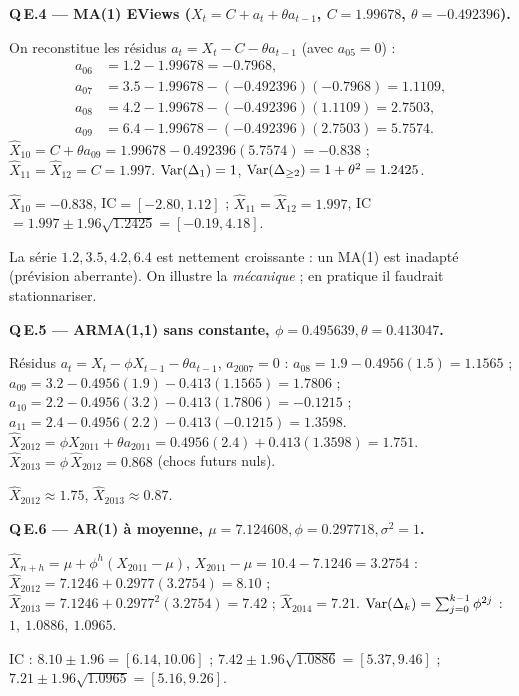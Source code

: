 \documentclass[11pt]{article}
\begin{document}
\textbf{Q\,E.4 --- MA(1) EViews ($X_t=C+a_t+\theta a_{t-1}$, $C=1.99678$, $\theta=-0.492396$).}
\begin{etapes}
On reconstitue les résidus $a_t=X_t-C-\theta a_{t-1}$ (avec $a_{05}=0$) :
\begin{align*}
a_{06}&=1.2-1.99678=-0.7968,\\
a_{07}&=3.5-1.99678-(-0.492396)(-0.7968)=1.1109,\\
a_{08}&=4.2-1.99678-(-0.492396)(1.1109)=2.7503,\\
a_{09}&=6.4-1.99678-(-0.492396)(2.7503)=5.7574.
\end{align*}
$\widehat X_{10}=C+\theta a_{09}=1.99678-0.492396(5.7574)=-0.838$ ;
$\widehat X_{11}=\widehat X_{12}=C=1.997$.
$\operatorname{Var}(\Delta_1)=1$, $\operatorname{Var}(\Delta_{\ge2})=1+\theta^2=1.2425$.
\end{etapes}
\begin{reponse}$\widehat X_{10}=-0.838$, IC$=[-2.80,1.12]$ ; $\widehat X_{11}=\widehat
X_{12}=1.997$, IC$=1.997\pm1.96\sqrt{1.2425}=[-0.19,4.18]$.\end{reponse}
\begin{attention}La série $1.2,3.5,4.2,6.4$ est nettement croissante : un MA(1) est
inadapté (prévision aberrante). On illustre la \emph{mécanique} ; en pratique il faudrait
stationnariser.\end{attention}

\textbf{Q\,E.5 --- ARMA(1,1) sans constante, $\phi=0.495639,\theta=0.413047$.}
\begin{etapes}
Résidus $a_t=X_t-\phi X_{t-1}-\theta a_{t-1}$, $a_{2007}=0$ :
$a_{08}=1.9-0.4956(1.5)=1.1565$ ; $a_{09}=3.2-0.4956(1.9)-0.413(1.1565)=1.7806$ ;
$a_{10}=2.2-0.4956(3.2)-0.413(1.7806)=-0.1215$ ;
$a_{11}=2.4-0.4956(2.2)-0.413(-0.1215)=1.3598$.
$\widehat X_{2012}=\phi X_{2011}+\theta a_{2011}=0.4956(2.4)+0.413(1.3598)=1.751$.
$\widehat X_{2013}=\phi\,\widehat X_{2012}=0.868$ (chocs futurs nuls).
\end{etapes}
\begin{reponse}$\widehat X_{2012}\approx1.75$, $\widehat X_{2013}\approx0.87$.\end{reponse}

\textbf{Q\,E.6 --- AR(1) à moyenne, $\mu=7.124608,\phi=0.297718,\sigma^2=1$.}
\begin{etapes}
$\widehat X_{n+h}=\mu+\phi^h(X_{2011}-\mu)$, $X_{2011}-\mu=10.4-7.1246=3.2754$ :
$\widehat X_{2012}=7.1246+0.2977(3.2754)=8.10$ ; $\widehat X_{2013}=7.1246+0.2977^2(3.2754)=7.42$ ;
$\widehat X_{2014}=7.21$. $\operatorname{Var}(\Delta_k)=\sum_{j=0}^{k-1}\phi^{2j}$ : $1,\ 1.0886,\ 1.0965$.
\end{etapes}
\begin{reponse}IC : $8.10\pm1.96=[6.14,10.06]$ ; $7.42\pm1.96\sqrt{1.0886}=[5.37,9.46]$ ;
$7.21\pm1.96\sqrt{1.0965}=[5.16,9.26]$.\end{reponse}
\end{document}

